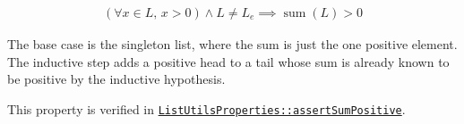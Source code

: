 \begin{equation*}
\begin{aligned}
(\forall x \in L,\, x > 0) \wedge L \neq L_e \implies \operatorname{sum}(L) > 0
\end{aligned}
\end{equation*}

The base case is the singleton list, where the sum is just the one
positive element. The inductive step adds a positive head to a tail whose
sum is already known to be positive by the inductive hypothesis.

{\raggedright
This property is verified in
\href{https://github.com/thiagomata/prime-numbers/blob/list-article-v1.0.0/src/main/scala/v1/chapter3/list/properties/ListUtilsProperties.scala}{\texttt{ListUtilsProperties::\allowbreak assertSumPositive}}.
\par}
